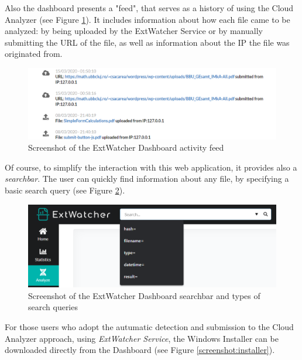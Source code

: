 Also the dashboard presents a "feed", that serves as a history of using the Cloud Analyzer (see Figure \ref{screenshot:feed}). It includes information about how each file came to be analyzed: by being uploaded by the ExtWatcher Service or by manually submitting the URL of the file, as well as information about the IP the file was originated from.

\begin{figure}[H]
	\centerline{\includegraphics[scale=0.6]{figures/feed.png}}  
	\caption{Screenshot of the ExtWatcher Dashboard activity feed}
	\label{screenshot:feed}
\end{figure}

Of course, to simplify the interaction with this web application, it provides also a \textit{searchbar}. The user can quickly find information about any file, by specifying a basic search query (see Figure \ref{screenshot:searchbar}).

\begin{figure}[H]
	\centerline{\includegraphics[scale=0.6]{figures/searchbar.png}}  
	\caption{Screenshot of the ExtWatcher Dashboard searchbar and types of search queries}
	\label{screenshot:searchbar}
\end{figure}

For those users who adopt the autumatic detection and submission to the Cloud Analyzer approach, using \textit{ExtWatcher Service}, the Windows Installer can be downloaded directly from the Dashboard (see Figure \ref{screenshot:installer}). 

